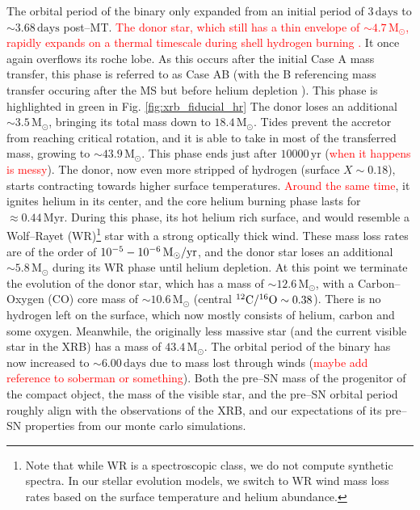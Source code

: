 \documentclass[linenumbers,trackchanges,twocolumn]{aastex701}
\newcommand{\Mdot}{\mathrm{M}_{\odot}}
\newcommand{\red}{\textcolor{red}}
\begin{document}
The orbital period of the binary only expanded from an initial period of $3\,\mathrm{days}$ to $\sim 3.68\,\mathrm{days}$ post--MT. \red{The donor star, which still has a thin envelope of $\sim 4.7\,\Mdot$, rapidly expands on a thermal timescale during shell hydrogen burning \citep{2017A&A...608A..11G}.} It once again overflows its roche lobe. As this occurs after the initial Case A mass transfer, this phase is referred to as Case AB (with the B referencing mass transfer occuring after the MS but before helium depletion \cite{1967ZA.....65..251K}). This phase is highlighted in green in Fig. \ref{fig:xrb_fiducial_hr} The donor loses an additional $\sim 3.5\,\Mdot$, bringing its total mass down to $18.4\,\Mdot$. Tides prevent the accretor from reaching critical rotation, and it is able to take in most of the transferred mass, growing to $\sim 43.9\,\Mdot$. This phase ends just after $10000\, \mathrm{yr}$ (\red{when it happens is messy}).  The donor, now even more stripped of hydrogen (surface $X \sim 0.18$), starts contracting towards higher surface temperatures. \red{Around the same time}, it ignites helium in its center, and the core helium burning phase lasts for $\approx 0.44\,\mathrm{Myr}$. During this phase, its hot helium rich surface, and would resemble a Wolf--Rayet (WR)\footnote{Note that while WR is a spectroscopic class, we do not compute synthetic spectra. In our stellar evolution models, we switch to WR wind mass loss rates based on the surface temperature and helium abundance.} star with a strong optically thick wind. These mass loss rates are of the order of $10^{-5} - 10^{-6} \,\Mdot/\rm yr$, and the donor star loses an additional $\sim 5.8\,\Mdot$ during its WR phase until helium depletion. At this point we terminate the evolution of the donor star, which has a mass of $\sim 12.6\,\Mdot$, with a Carbon--Oxygen (CO) core mass of $\sim 10.6\,\Mdot$ (central $\rm ^{12}C/^{16}O \sim 0.38$). There is no hydrogen left on the surface, which now mostly consists of helium, carbon and some oxygen. Meanwhile, the originally less massive star (and the current visible star in the XRB) has a mass of $43.4\,\Mdot$. The orbital period of the binary has now increased to $\sim 6.00\,\mathrm{days}$ due to mass lost through winds (\red{maybe add reference to soberman or something}). Both the pre--SN mass of the progenitor of the compact object, the mass of the visible star, and the pre--SN orbital period roughly align with the observations of the XRB, and our expectations of its pre--SN properties from our monte carlo simulations.
\end{document}
